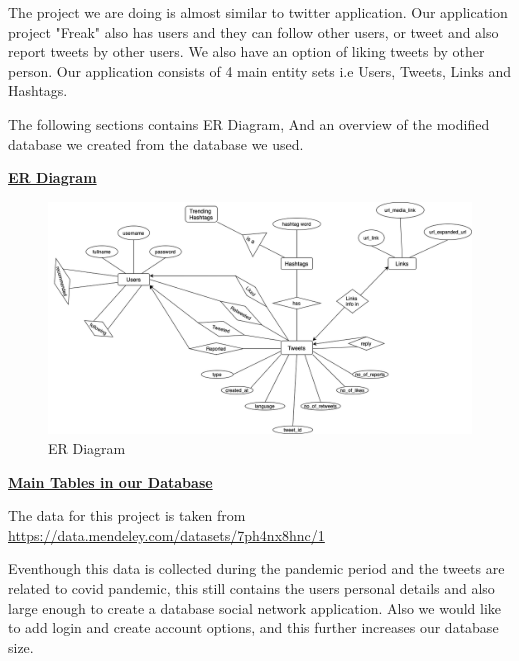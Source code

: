 \documentclass{uofa-eng-assignment}
\begin{document}
\maketitle

\noindent The project we are doing is almost similar to twitter application. Our application project "Freak" also has users and they can follow other users, or tweet and also report tweets by other users. We also have an option of liking tweets by other person. Our application consists of 4 main entity sets i.e Users, Tweets, Links and Hashtags.  

\noindent The following sections contains ER Diagram, And an overview of the modified database we created from the database we used.

\begin{center}
    \underline{\textbf{ER Diagram}}
\end{center}


        \begin{figure}[h]
        \begin{center}
            \includegraphics[scale=0.45]{erdiag.png}
            \caption{ER Diagram}
        \end{center}
        \end{figure}

\clearpage

\begin{center}
    \underline{\textbf{Main Tables in our Database}}
\end{center}

\noindent The data for this project is taken from \href{https://data.mendeley.com/datasets/7ph4nx8hnc/1}{https://data.mendeley.com/datasets/7ph4nx8hnc/1}

\noindent Eventhough this data is collected during the pandemic period and the tweets are related to covid pandemic, this still contains the users personal details and also large enough to create a database social network application. Also we would like to add login and create account options, and this further increases our database size.
\end{document}

